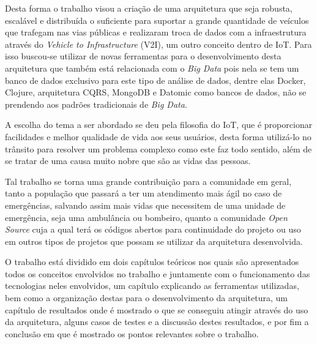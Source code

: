 Desta forma o trabalho visou a criação de uma arquitetura que seja robusta, escalável e distribuída o suficiente para suportar a grande quantidade de veículos que trafegam nas vias públicas e realizaram troca de dados com a infraestrutura através do \textit{Vehicle to Infrastructure} (V2I), um outro conceito dentro de IoT. Para isso buscou-se utilizar de novas ferramentas para o desenvolvimento desta arquitetura que também está relacionada com o \textit{Big Data} pois nela se tem um banco de dados exclusivo para este tipo de análise de dados, dentre elas Docker, Clojure, arquitetura CQRS, MongoDB e Datomic como bancos de dados, não se prendendo aos padrões tradicionais de \textit{Big Data}.

A escolha do tema a ser abordado se deu pela filosofia do IoT, que é proporcionar facilidades e melhor qualidade de vida aos seus usuários, desta forma utilizá-lo no trânsito para resolver um problema complexo como este faz todo sentido, além de se tratar de uma causa muito nobre que são as vidas das pessoas.

Tal trabalho se torna uma grande contribuição para a comunidade em geral, tanto a população que passará a ter um atendimento mais ágil no caso de emergências, salvando assim mais vidas que necessitem de uma unidade de emergência, seja uma ambulância ou bombeiro, quanto a comunidade \textit{Open Source} cuja a qual terá os códigos abertos para continuidade do projeto ou uso em outros tipos de projetos que possam se utilizar da arquitetura desenvolvida.

O trabalho está dividido em dois capítulos teóricos nos quais são apresentados todos os conceitos envolvidos no trabalho e juntamente com o funcionamento das tecnologias neles envolvidos, um capítulo explicando as ferramentas utilizadas, bem como a organização destas para o desenvolvimento da arquitetura, um capítulo de resultados onde é mostrado o que se conseguiu atingir através do uso da arquitetura, alguns casos de testes e a discussão destes resultados, e por fim a conclusão em que é mostrado os pontos relevantes sobre o trabalho.
